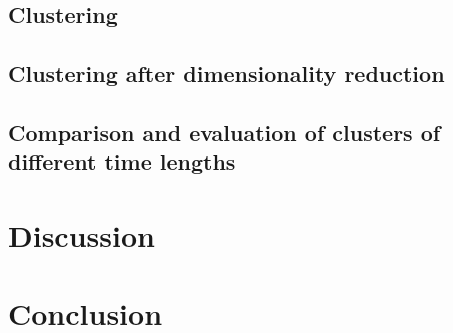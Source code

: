   \subsection{Clustering}
  \label{section:ExperimentClustering}
  

  \subsection{Clustering after dimensionality reduction}
  \label{section:ExperimentClusteringAfterDimensionalityReduction}
  

  \subsection{Comparison and evaluation of clusters of different time lengths}
  \label{section:ExperimentComparisonTimeLengths}
  



\section{Discussion}
\label{section:Discussion}




\section{Conclusion}
\label{section:Conclusion}


